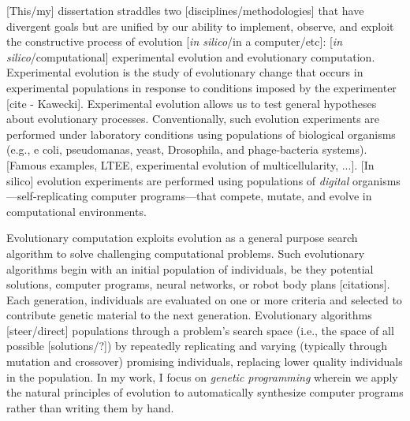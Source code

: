 

[This/my] dissertation straddles two [disciplines/methodologies] that have divergent goals but are unified by our ability to implement, observe, and exploit the constructive process of evolution [\textit{in silico}/in a computer/etc]: [\textit{in silico}/computational] experimental evolution and evolutionary computation.
Experimental evolution is the study of evolutionary change that occurs in experimental populations in response to conditions imposed by the experimenter [cite - Kawecki].
Experimental evolution allows us to test general hypotheses about evolutionary processes. 
Conventionally, such evolution experiments are performed under laboratory conditions using populations of biological organisms (e.g., e coli, pseudomanas, yeast, Drosophila, and phage-bacteria systems). 
[Famous examples, LTEE, experimental evolution of multicellularity, ...].
[In silico] evolution experiments are performed using populations of \textit{digital} organisms---self-replicating computer programs---that compete, mutate, and evolve in computational environments. 

Evolutionary computation exploits evolution as a general purpose search algorithm to solve challenging computational problems.
Such evolutionary algorithms begin with an initial population of individuals, be they potential solutions, computer programs, neural networks, or robot body plans [citations]. 
Each generation, individuals are evaluated on one or more criteria and selected to contribute genetic material to the next generation.
Evolutionary algorithms [steer/direct] populations through a problem's search space (i.e., the space of all possible [solutions/?]) by repeatedly replicating and varying (typically through mutation and crossover) promising individuals, replacing lower quality individuals in the population.
In my work, I focus on \textit{genetic programming} wherein we apply the natural principles of evolution to automatically synthesize computer programs rather than writing them by hand.

